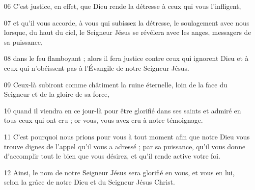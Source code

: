 
06 C’est justice, en effet, que Dieu rende la détresse à ceux qui vous l’infligent,

07 et qu’il vous accorde, à vous qui subissez la détresse, le soulagement avec nous lorsque, du haut du ciel, le Seigneur Jésus se révélera avec les anges, messagers de sa puissance,

08 dans le feu flamboyant ; alors il fera justice contre ceux qui ignorent Dieu et à ceux qui n’obéissent pas à l’Évangile de notre Seigneur Jésus.

09 Ceux-là subiront comme châtiment la ruine éternelle, loin de la face du Seigneur et de la gloire de sa force,

10 quand il viendra en ce jour-là pour être glorifié dans ses saints et admiré en tous ceux qui ont cru ; or vous, vous avez cru à notre témoignage.

11 C’est pourquoi nous prions pour vous à tout moment afin que notre Dieu vous trouve dignes de l’appel qu’il vous a adressé ; par sa puissance, qu’il vous donne d’accomplir tout le bien que vous désirez, et qu’il rende active votre foi.

12 Ainsi, le nom de notre Seigneur Jésus sera glorifié en vous, et vous en lui, selon la grâce de notre Dieu et du Seigneur Jésus Christ.